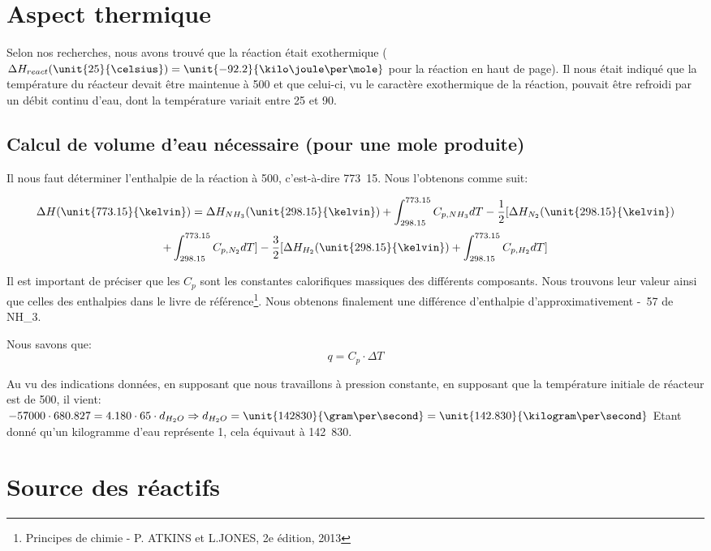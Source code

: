 \documentclass[11pt,a4paper]{report}
\begin{document}
\section*{Aspect thermique}
Selon nos recherches, nous avons trouvé que la réaction était exothermique ($\Delta H_{react}(\unit{25}{\celsius}) = \unit{-92.2}
{\kilo\joule \per \mole}$ pour la réaction en haut de page). Il nous était indiqué que la température du réacteur devait être maintenue à \unit{500}{\celsius} et que celui-ci, 
vu le caractère exothermique de la réaction, pouvait être refroidi par un débit continu d'eau, dont la température 
variait entre \unit{25}{\celsius} et \unit{90}{\celsius}.

\subsection*{Calcul de volume d'eau nécessaire (pour une mole produite)}

Il nous faut déterminer l'enthalpie de la réaction à \unit{500}{\celsius}, c'est-à-dire \unit{773.15}{\kelvin}.
Nous l'obtenons comme suit:

$$\Delta H(\unit{773.15}{\kelvin}) = \Delta H_{NH_3}(\unit{298.15}{\kelvin}) + \int_{298.15}^{773.15} C_{p, NH_3} dT 
 - \frac{1}{2} \lbrack \Delta H_{N_2}(\unit{298.15}{\kelvin}) $$ 
$$+ \int_{298.15}^{773.15} C_{p, N_2} dT \rbrack - \frac{3}{2}  \lbrack \Delta H_{H_2}(\unit{298.15}{\kelvin}) + \int_{298.15}^{773.15} C_{p, H_2} dT  \rbrack $$

Il est important de préciser que les $C_{p}$ sont les constantes calorifiques massiques des différents composants. 
Nous trouvons leur valeur ainsi que celles des enthalpies dans le livre de référence\footnote{Principes de chimie - P. ATKINS et L.JONES, 2e édition, 2013}.
Nous obtenons finalement une différence d'enthalpie d'approximativement \unit{-57}{\kilo\joule\per\mole} de NH_3.

Nous savons que:
$$q =  C_{p} \cdot \Delta T$$

Au vu des indications données, en supposant que nous travaillons à pression constante, en supposant que la température initiale de
réacteur est de \unit{500}{\celsius}, il vient:
$-57000 \cdot 680.827 = 4.180 \cdot 65 \cdot d_{H_{2}O} \Rightarrow  d_{H_{2}O} = \unit{142830}{\gram\per\second} = \unit{142.830}{\kilogram\per\second}$
Etant donné qu'un kilogramme d'eau représente \unit{1}{\liter}, cela équivaut à  \unit{142.830}{\liter\per\second}.

\section*{Source des réactifs}
\end{document}
